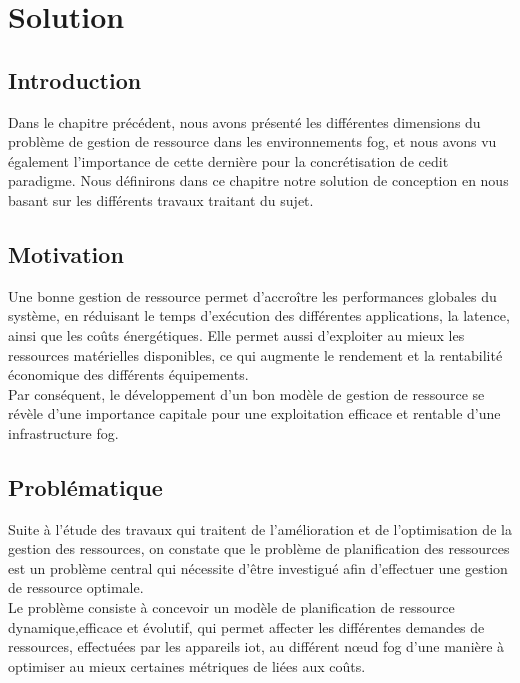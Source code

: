 \chapter{Solution}
\section{Introduction}
Dans le chapitre précédent, nous avons présenté les différentes dimensions du problème de gestion de ressource dans les environnements fog, et nous avons vu également l’importance de cette dernière pour la concrétisation de cedit paradigme.
Nous définirons dans ce chapitre notre solution de conception en nous basant sur les différents travaux traitant du sujet.
\section{Motivation}
Une bonne gestion de ressource permet d'accroître les performances globales du système, en réduisant le temps d'exécution des différentes applications, la latence, ainsi que les coûts énergétiques. Elle permet aussi d’exploiter au mieux les ressources matérielles disponibles, ce qui augmente le rendement et la rentabilité économique des différents équipements.\\ 
Par conséquent, le développement d’un bon modèle de gestion de ressource se révèle d’une importance capitale pour une exploitation efficace et rentable d’une infrastructure fog.
\section{Problématique}
Suite à l’étude des travaux qui traitent de l’amélioration et de l’optimisation de la gestion des ressources, on constate que le problème de planification des ressources est un problème central qui nécessite d'être investigué afin d’effectuer une gestion de ressource optimale. \\
Le problème consiste à concevoir un modèle de planification de ressource dynamique,efficace et évolutif, qui permet affecter les différentes demandes de ressources, effectuées par les appareils iot, au différent nœud fog d’une manière à optimiser au mieux certaines métriques de liées aux coûts.
